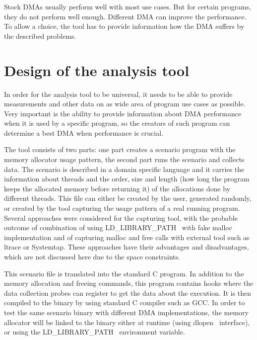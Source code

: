 \documentclass{eeict}
\begin{document}
Stock DMAs usually perform well with most use cases. But for certain programs, they do not perform well enough. Different DMA can improve the performance. To allow a choice, the tool has to provide information how the DMA suffers by the described problems.

\section{Design of the analysis tool}

In order for the analysis tool to be universal, it needs to be able to provide measurements and other data on as wide area of program use cases as possible. Very important is the ability to provide information about DMA performance when it is used by a specific program, so the creators of such program can determine a best DMA when performance is crucial.

The tool consists of two parts: one part creates a scenario program with the memory allocator usage pattern, the second part runs the scenario and collects data. The scenario is described in a domain specific language and it carries the information about threads and the order, size and length (how long the program keeps the allocated memory before returning it) of the allocations done by different threads. This file can either be created by the user, generated randomly, or created by the tool capturing the usage pattern of a real running program. Several approaches were considered for the capturing tool, with the probable outcome of combination of using LD\_LIBRARY\_PATH~\cite{cman} with fake malloc implementation and of capturing malloc and free calls with external tool such as ltrace or Systemtap. These approaches have their advantages and disadvantages, which are not discussed here due to the space constraints.

This scenario file is translated into the standard C program. In addition to the memory allocation and freeing commands, this program contains hooks where the data collection probes can register to get the data about the execution. It is then compiled to the binary by using standard C compiler such as GCC. In order to test the same scenario binary with different DMA implementations, the memory allocator will be linked to the binary either at runtime (using dlopen~\cite{cman} interface), or using the LD\_LIBRARY\_PATH~\cite{cman} environment variable.
\end{document}

